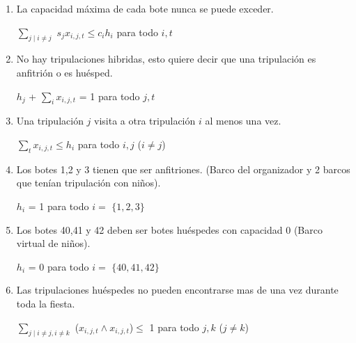 \documentclass[spanish, fleqn]{article}
\begin{document}
\begin{enumerate}
\item La capacidad máxima de cada bote nunca se puede exceder.

\begin{center}
$\displaystyle \sum_{\mathit{j} \mid \mathit{i} \neq \mathit{j}}$ $ \mathit{s}_{\mathit{j}} \mathit{x}_{\mathit{i},\mathit{j},\mathit{t}} \leq \mathit{c}_{\mathit{i}} \mathit{h}_{\mathit{i}}$ para todo $ \mathit{i},\mathit{t}$
\end{center}

\item No hay tripulaciones hibridas, esto quiere decir que una tripulación es anfitrión o es huésped.

\begin{center}
$\mathit{h}_{\mathit{j}}$ + $ \displaystyle \sum_{\mathit{i}} \mathit{x}_{\mathit{i},\mathit{j},\mathit{t}}$ = 1 para todo $ \mathit{j},\mathit{t}$
\end{center}

\item Una tripulación $\mathit{j}$ visita a otra tripulación $\mathit{i}$ al menos una vez.

\begin{center}
$ \displaystyle \sum_{\mathit{t}} \mathit{x}_{\mathit{i},\mathit{j},\mathit{t}} \leq \mathit{h}_{\mathit{i}}$ para todo $\mathit{i},\mathit{j}$ ($\mathit{i} \neq \mathit{j}$)
\end{center}

\item Los botes 1,2 y 3 tienen que ser anfitriones. (Barco del organizador y 2 barcos que tenían tripulación con niños).

\begin{center}
$  \mathit{h}_{\mathit{i}}$ = 1 para todo $ \mathit{i} =$ $\{1,2,3\}$
\end{center}

\item Los botes 40,41 y 42 deben ser botes huéspedes con capacidad 0 (Barco virtual de niños).

\begin{center}
$  \mathit{h}_{\mathit{i}}$ = 0 para todo $ \mathit{i} =$ $\{40,41,42\}$
\end{center}

\item Las tripulaciones huéspedes no pueden encontrarse mas de una vez durante toda la fiesta.

\begin{center}
$\displaystyle \sum_{\mathit{j} \mid \mathit{i} \neq \mathit{j},\mathit{i} \neq \mathit{k}}$ ($\mathit{x}_{\mathit{i},\mathit{j},\mathit{t}} \wedge \mathit{x}_{\mathit{i},\mathit{j},\mathit{t}}$)$\leq $ 1 para todo $ \mathit{j},\mathit{k}$ ($\mathit{j} \neq \mathit{k}$)
\end{center}


\end{enumerate}
\end{document}
